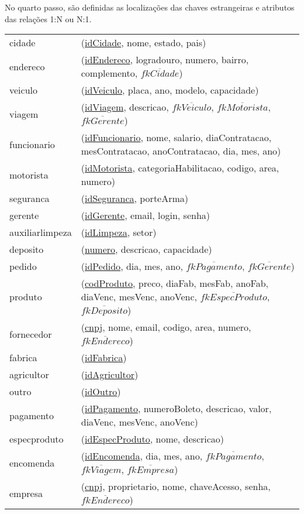 \documentclass[12pt, onecolumn, titlepage]{article}
\begin{document}
\newpage
No quarto passo, são definidas as localizações das chaves estrangeiras e atributos das relações 1:N ou N:1.

\begin{table}[htb!]
\begin{center}
\begin{tabular}{p{2.5cm} p{10.5cm}}
cidade & (\underline{idCidade}, nome, estado, pais) \\
endereco & (\underline{idEndereco}, logradouro, numero, bairro, complemento, $\overline{fkCidade}$) \\
veiculo & (\underline{idVeiculo}, placa, ano, modelo, capacidade) \\
viagem & (\underline{idViagem}, descricao, $\overline{fkVeiculo}$, $\overline{fkMotorista}$, $\overline{fkGerente}$) \\
funcionario & (\underline{idFuncionario}, nome, salario, diaContratacao, mesContratacao, anoContratacao, dia, mes, ano)\\
motorista & (\underline{idMotorista}, categoriaHabilitacao, codigo, area, numero)\\
seguranca & (\underline{idSeguranca}, porteArma)\\
gerente & (\underline{idGerente}, email, login, senha)\\
auxiliarlimpeza & (\underline{idLimpeza}, setor)\\
deposito & (\underline{numero}, descricao, capacidade)\\
pedido & (\underline{idPedido}, dia, mes, ano, $\overline{fkPagamento}$, $\overline{fkGerente}$)\\
produto & (\underline{codProduto}, preco, diaFab, mesFab, anoFab, diaVenc, mesVenc, anoVenc, $\overline{fkEspecProduto}$, $\overline{fkDeposito}$)\\
fornecedor & (\underline{cnpj}, nome, email, codigo, area, numero, $\overline{fkEndereco}$)\\
fabrica & (\underline{idFabrica})\\
agricultor & (\underline{idAgricultor})\\
outro & (\underline{idOutro})\\
pagamento & (\underline{idPagamento}, numeroBoleto, descricao, valor, diaVenc, mesVenc, anoVenc)\\
especproduto & (\underline{idEspecProduto}, nome, descricao)\\
encomenda & (\underline{idEncomenda}, dia, mes, ano, $\overline{fkPagamento}$, $\overline{fkViagem}$, $\overline{fkEmpresa}$)\\
empresa & (\underline{cnpj}, proprietario, nome, chaveAcesso, senha, $\overline{fkEndereco}$)
\end{tabular}
\end{center}
\end{table}
\end{document}
